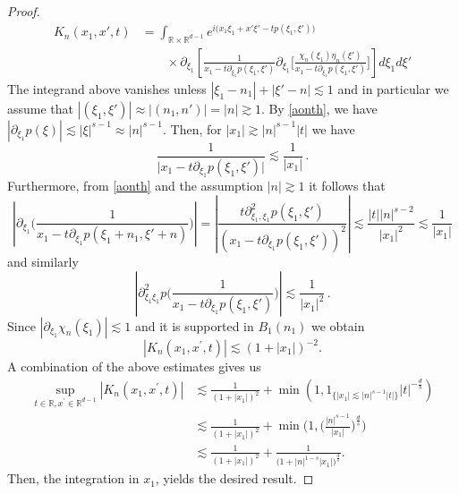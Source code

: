 \documentclass[10pt,leqno]{amsart}
\newcommand{\R}{\mathbb{R}}
\numberwithin{equation}{section}
\begin{document}
\begin{proof}
\begin{align*}
K_n(x_1 ,x' ,t)
&= \int_{\R \times \R^{d-1}}  e^{i\big(x_1 \xi_1 +x' \xi'-t p (\xi_1, \xi') \big)} 
\\
&\qquad \times
\partial_{\xi_{1}} \left[ \frac{1}{x_1 - t\partial_{\xi_{1}}p(\xi_1, \xi')} 
\partial_{\xi_{1}}\Big[\frac{\chi_n(\xi_1) \eta_n (\xi')}{x_1 - t\partial_{\xi_{1}}p(\xi_1, \xi')} \Big]\right] d\xi_1 d\xi'
\end{align*}
The integrand above vanishes unless \(|\xi_{1}-n_{1}|+|\xi'-n|\lesssim1\) and in particular we assume that \(|(\xi_{1},\xi')|\approx|(n_{1},n')|=|n|\gtrsim1\).
By \eqref{aonth}, we have 
 $|\partial_{\xi_{1}}p(\xi)| \lesssim | \xi |^{s-1}\approx |n|^{s-1}$. Then, for  \(|x_{1}|\gtrsim|n|^{s-1}|t|\) we have 
\begin{equation*}
\frac{1}{\big|x_1 - t\partial_{\xi_{1}}p(\xi_1, \xi')\big|}\lesssim\frac{1}{|x_{1}|} \,.
\end{equation*}
Furthermore, from \eqref{aonth} and the assumption $|n| \gtrsim 1$ it follows that
\begin{equation*}
\left| \partial_{\xi_1} \Big( \frac{1}{x_1 - t\partial_{\xi_{1}}p(\xi_1+n_1, \xi' + n)} \Big) \right| =
\left| \frac{t\partial_{\xi_{1},\xi_{1}}^{2}p(\xi_1, \xi')}{(x_1 - t\partial_{\xi_{1}}p(\xi_1, \xi'))^2} \right|
\lesssim \frac{|t||n|^{s-2}}{|x_1|^{2}}
 \lesssim \frac{1}{|x_1|}
\end{equation*}
and similarly
$$
\left| \partial^2_{\xi_1\xi_1}p \Big( \frac{1}{x_1 - t\partial_{\xi_{1}}p(\xi_1, \xi')} \Big) \right|
 \lesssim \frac{1}{|x_1|^2} \,.
$$
Since $|\partial_{\xi_1} \chi_n(\xi_1)| \lesssim 1$ and it is supported in \(B_{1}(n_{1})\) we obtain
$$|K_n(x_1 ,x^\prime ,t)|\lesssim    (1+ |x_1| )^{-2}.$$
A combination of the above estimates gives us
\begin{align*}
\sup_{t\in \R , x^\prime \in \R^{d-1}} |K_n (x_1, x^\prime ,t)|& \lesssim \frac{1}{(1+ |x_1|)^{2}}  +\min (1 , 1_{\{|x_1| \lesssim |n|^{s - 1} |t|\} }  |t|^{-\frac{d}{s}})\\
& \lesssim \frac{1}{(1+ |x_1|)^{2}}  + \min \bigg(1 ,  \bigg(\frac{|n|^{s - 1}}{|x_1|}\bigg)^{\frac{d}{s} } \bigg)\\
&\lesssim \frac{1}{(1+ |x_1|)^{2}}  +\frac{1}{\Big(1+|n|^{1-s}|x_1|\Big)^{\frac{d}{s}}}
.
\end{align*}
Then, the integration in $x_1$, yields the desired result.
\end{proof}
\end{document}

